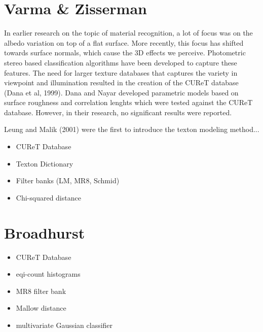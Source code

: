 \hypertarget{RelatedWork}{
\section{Varma \& Zisserman}\label{VarmaZisserman}
}

In earlier research on the topic of material recognition, a lot of focus was on the albedo variation on top of a flat surface. More recently, this focus has shifted towards surface normals, which cause the 3D effects we perceive. Photometric stereo based classification algorithms have been developed to capture these features.
The need for larger texture databases that captures the variety in viewpoint and illumination resulted in the creation of the CUReT database (Dana et al, 1999). Dana and Nayar developed parametric models based on surface roughness and correlation lenghts which were tested against the CUReT database. However, in their research, no significant results were reported.

Leung and Malik (2001) were the first to introduce the texton modeling method...

\begin{itemize}
	\item{CUReT Database}
	\item{Texton Dictionary}
	\item{Filter banks (LM, MR8, Schmid)}
	\item{Chi-squared distance}
\end{itemize}

\section{Broadhurst}\label{Broadhurst}
\begin{itemize}
	\item{CUReT Database}
	\item{eqi-count histograms}
	\item{MR8 filter bank}
	\item{Mallow distance}
	\item{multivariate Gaussian classifier}
\end{itemize}


